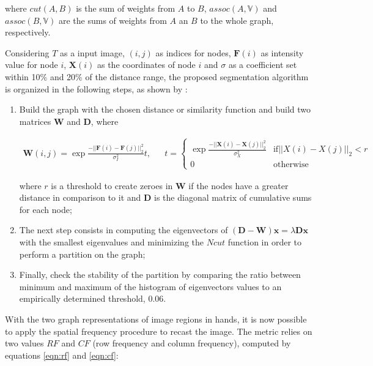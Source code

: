 \noindent where $cut(A,B)$ is the sum of 
weights from $A$ to $B$, $assoc(A,\mathbb{V})$ and $assoc(B,\mathbb{V})$ are the sums of weights from $A$ an $B$ to the whole graph, respectively.

Considering $T$ as a input image, $(i,j)$ as indices for nodes, $\mathbf{F}(i)$ as intensity value for node $i$, $\mathbf{X}(i)$ as the coordinates of node $i$ and $\sigma$ as a coefficient set within 10\% and 20\% of the distance range, the proposed segmentation algorithm is organized in the following steps, as shown by \cite{li2008multifocus}:
    
\begin{enumerate}[label=\Roman*.]
    \item Build the graph with the chosen distance or similarity function and build two matrices $\mathbf{W}$ and $\mathbf{D}$, where
    
    \begin{align*}
        \mathbf{W}(i,j) = 
        \exp{\frac{-||\mathbf{F}(i)-\mathbf{F}(j)||_{2}^{2}}{\sigma_{I}^{2}}} t,
        &&
        t = 
        \begin{cases}
            \exp{\frac{-||\mathbf{X}(i)-\mathbf{X}(j)||_{2}^{2}}{\sigma_{X}^{2}}} & \text{if}
            ||X(i)-X(j)||_{2} < r
            \\0 & \text{otherwise}
        \end{cases}
    \end{align*}
    
    where $r$ is a threshold to create zeroes in $\mathbf{W}$ if the nodes have a greater distance in comparison to it and $\mathbf{D}$ is the diagonal matrix of cumulative sums for each node;
    
    \item The next step consists in computing the eigenvectors of $(\mathbf{D} - \mathbf{W})\mathbf{x} = \lambda\mathbf{D}\mathbf{x}$ with the smallest eigenvalues and minimizing the $Ncut$ function in order to perform a partition on the graph;
    
    \item Finally, check the stability of the partition by comparing the ratio between minimum and maximum of the histogram of eigenvectors values to an empirically determined threshold, $0.06$.
\end{enumerate}

With the two graph representations of image regions in hands, it is now possible to apply the spatial frequency procedure to recast the image. The metric relies on two values $RF$ and $CF$ (row frequency and column frequency), computed by equations \ref{eqn:rf} and \ref{eqn:cf}:

